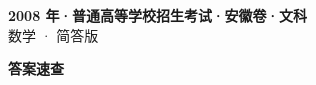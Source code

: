 \documentclass[zihao=-4, a4paper]{ctexart}
\begin{document}
\begin{center}
  {\Large\bfseries 2008 年·普通高等学校招生考试·安徽卷·文科}\\[4pt]
  {\large 数学 · 简答版}
\end{center}
\medskip
{}

\clearpage
{}
\begin{center}{\Large\bfseries 答案速查}\end{center}
\medskip

\end{document}
